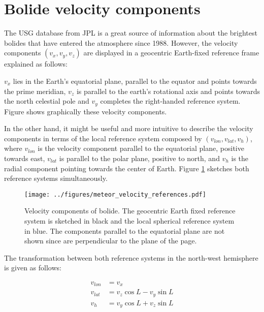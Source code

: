 \appendix

\section{Bolide velocity components}
\label{app:velocity}
The USG database from JPL is a great source of information about the brightest bolides that have entered the atmosphere since 1988. However, the velocity components $(v_x, v_y, v_z)$ are displayed in a geocentric Earth-fixed reference frame explained as follows:

$v_x$ lies in the Earth's equatorial plane, parallel to the equator and points towards the prime meridian, $v_z$ is parallel to the earth's rotational axis and points towards the north celestial pole and $v_y$ completes the right-handed reference system. Figure  shows graphically these velocity components.

In the other hand, it might be useful and more intuitive to describe the velocity components in terms of the local reference system composed by $(v_{lon}, v_{lat}, v_h)$, where $v_{lon}$ is the velocity component parallel to the equatorial plane, positive towards east, $v_{lat}$ is parallel to the polar plane, positive to north, and $v_h$ is the radial component pointing towards the center of Earth. Figure \ref{fig:ref_velocity} sketches both reference systems simultaneously.

\begin{figure}
    \centering
    \texttt{[image: ../figures/meteor\_velocity\_references.pdf]}
    \caption{Velocity components of bolide. The geocentric Earth fixed reference system is sketched in black and the local spherical reference system in blue. The components parallel to the equatorial plane are not shown since are perpendicular to the plane of the page.}
    \label{fig:ref_velocity}
\end{figure}

The transformation between both reference systems in the north-west hemisphere is given as follows:

\begin{align}
v_{lon} &= v_x \label{eq:vlon}\\
v_{lat} &= v_z\cos{L} - v_y\sin{L} \label{eq:vlat}\\
v_h     &= v_y\cos{L} + v_z\sin{L} \label{eq:vh}
\end{align}

